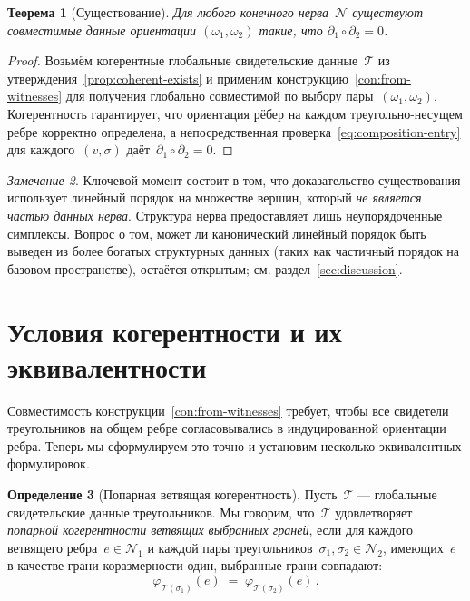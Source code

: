 \documentclass[11pt,a4paper]{article}
\theoremstyle{plain}
\newtheorem{theorem}{Теорема}[section]
\theoremstyle{definition}
\newtheorem{definition}[theorem]{Определение}
\theoremstyle{remark}
\newtheorem{remark}[theorem]{Замечание}
\newcommand{\cN}{\mathcal{N}}
\newcommand{\cT}{\mathcal{T}}
\newcommand{\chosenface}{\varphi}
\begin{document}
\begin{theorem}[Существование]
\label{thm:existence}
Для любого конечного нерва~$\cN$ существуют совместимые данные
ориентации $(\omega_1, \omega_2)$ такие, что
$\partial_1 \circ \partial_2 = 0$.
\end{theorem}

\begin{proof}
Возьмём когерентные глобальные свидетельские данные~$\cT$ из
утверждения~\ref{prop:coherent-exists} и применим
конструкцию~\ref{con:from-witnesses} для получения глобально совместимой
по выбору пары~$(\omega_1, \omega_2)$. Когерентность гарантирует,
что ориентация рёбер на каждом треугольно-несущем ребре корректно
определена, а непосредственная проверка~\eqref{eq:composition-entry}
для каждого~$(v, \sigma)$ даёт~$\partial_1 \circ \partial_2 = 0$.
\end{proof}

\begin{remark}
\label{rem:noncanonical}
Ключевой момент состоит в том, что доказательство существования
использует линейный порядок на множестве вершин, который \emph{не является
частью данных нерва}. Структура нерва предоставляет лишь неупорядоченные
симплексы. Вопрос о том, может ли канонический линейный порядок быть
выведен из более богатых структурных данных (таких как частичный порядок
на базовом пространстве), остаётся открытым; см.
раздел~\ref{sec:discussion}.
\end{remark}

\section{Условия когерентности и их эквивалентности}
\label{sec:coherence}

Совместимость конструкции~\ref{con:from-witnesses} требует, чтобы все
свидетели треугольников на общем ребре согласовывались в индуцированной
ориентации ребра. Теперь мы сформулируем это точно и установим
несколько эквивалентных формулировок.

\begin{definition}[Попарная ветвящая когерентность]
\label{def:coherence}
Пусть~$\cT$ --- глобальные свидетельские данные треугольников. Мы
говорим, что~$\cT$ удовлетворяет \emph{попарной когерентности ветвящих
выбранных граней}, если для каждого ветвящего ребра~$e \in \cN_1$
и каждой пары треугольников~$\sigma_1, \sigma_2 \in \cN_2$, имеющих~$e$
в качестве грани коразмерности один, выбранные грани совпадают:
\[
  \chosenface_{\cT(\sigma_1)}(e)
  \;=\; \chosenface_{\cT(\sigma_2)}(e)\,.
\]
\end{definition}
\end{document}
